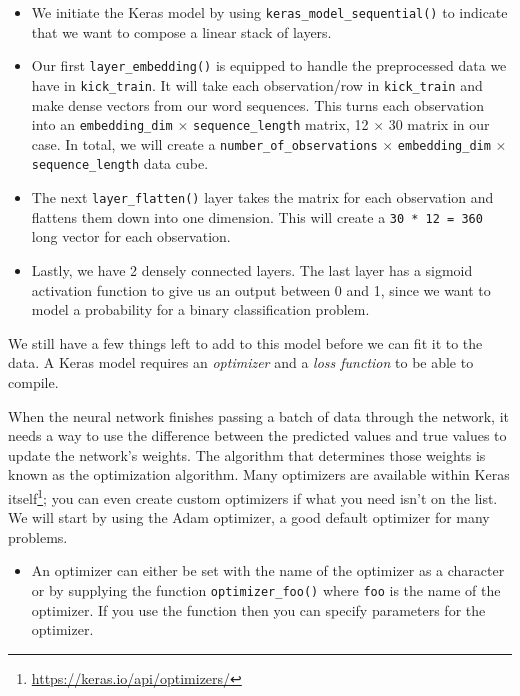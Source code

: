 \documentclass[
]{krantz}
\newenvironment{rmdblock}[1]
  {\begin{shaded*}
  \begin{itemize}[left = -1cm, labelsep = 1cm]
  \renewcommand{\labelitemi}{
    \raisebox{-.7\height}[0pt][0pt]{
      {\setkeys{Gin}{width=3em,keepaspectratio}\texttt{[image: images/\#1]}}
    }
  }
 
  \item
  }
  {
  \end{itemize}
  \end{shaded*}
  }
\newenvironment{rmdnote}
  {\begin{rmdblock}{note}}
  {\end{rmdblock}}
\begin{document}
\begin{itemize}
\item
  We initiate the Keras model by using \texttt{keras\_model\_sequential()} to indicate that we want to compose a linear stack of layers.
\item
  Our first \texttt{layer\_embedding()} is equipped to handle the preprocessed data we have in \texttt{kick\_train}. It will take each observation/row in \texttt{kick\_train} and make dense vectors from our word sequences. This turns each observation into an \texttt{embedding\_dim} \(\times\) \texttt{sequence\_length} matrix, 12 \(\times\) 30 matrix in our case. In total, we will create a \texttt{number\_of\_observations} \(\times\) \texttt{embedding\_dim} \(\times\) \texttt{sequence\_length} data cube.
\item
  The next \texttt{layer\_flatten()} layer takes the matrix for each observation and flattens them down into one dimension. This will create a \texttt{30\ *\ 12\ =\ 360} long vector for each observation.
\item
  Lastly, we have 2 densely connected layers. The last layer has a sigmoid activation function to give us an output between 0 and 1, since we want to model a probability for a binary classification problem.
\end{itemize}

We still have a few things left to add to this model before we can fit it to the data. A Keras model requires an \emph{optimizer} and a \emph{loss function} to be able to compile.

When the neural network finishes passing a batch of data through the network, it needs a way to use the difference between the predicted values and true values to update the network's weights. The algorithm that determines those weights is known as the optimization algorithm. Many optimizers are available within Keras itself\footnote{\url{https://keras.io/api/optimizers/}}; you can even create custom optimizers if what you need isn't on the list. We will start by using the Adam optimizer, a good default optimizer for many problems.

\begin{rmdnote}
An optimizer can either be set with the name of the optimizer as a
character or by supplying the function \texttt{optimizer\_foo()} where
\texttt{foo} is the name of the optimizer. If you use the function then
you can specify parameters for the optimizer.
\end{rmdnote}
\end{document}
